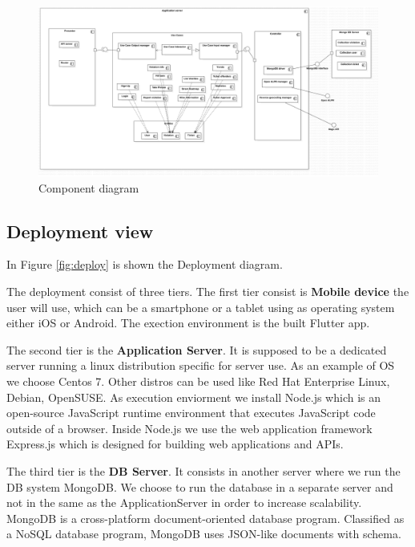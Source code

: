 \begin{figure}
\centering
\includegraphics[width=\textwidth]{Images/ComponentDiagram2.png}
\caption{\label{fig:compdiag} Component diagram}
\end{figure}





\subsection{Deployment view}

In Figure \ref{fig:deploy} is shown the Deployment diagram.

The deployment consist of three tiers. The first tier consist is \textbf{Mobile device} the user will use, which can be a smartphone or a tablet using as operating system either iOS or Android.
The exection environment is the built Flutter app.


The second tier is the \textbf{Application Server}. It is supposed to be a dedicated server running a linux distribution specific for server use. As an example of OS we choose Centos 7. Other distros can be used like Red Hat Enterprise Linux, Debian, OpenSUSE.
As execution enviorment we install Node.js which is an open-source JavaScript runtime environment that executes JavaScript code outside of a browser. Inside Node.js we use the web application framework Express.js which is designed for building web applications and APIs.


The third tier is the \textbf{DB Server}. It consists in another server where we run the DB system MongoDB. We choose to run the database in a separate server and not in the same as the ApplicationServer in order to increase scalability. MongoDB is a cross-platform document-oriented database program. Classified as a NoSQL database program, MongoDB uses JSON-like documents with schema.




